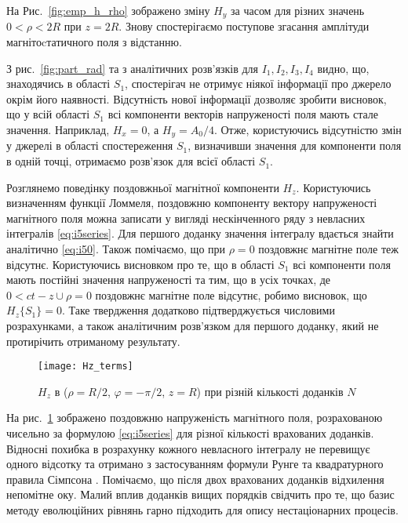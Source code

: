 На Рис.~\ref{fig:emp_h_rho} зображено зміну $ H_y $ за часом для 
різних значень $ 0 < \rho < 2R $ при $ z = 2R $. Знову спостерігаємо 
поступове згасання амплітуди магнітоcтатичного поля з відстанню.

З рис.~\ref{fig:part_rad} та з аналітичних розв'язків для 
$ I_1, I_2, I_3, I_4 $ видно, що, знаходячись в області $ S_1 $, 
спостерігач не отримує ніякої інформації про джерело окрім його наявності.
Відсутність нової інформації дозволяє зробити висновок, що у всій області 
$ S_1 $ всі компоненти векторів напруженості поля мають стале значення.
Наприклад, $ H_x = 0 $, а $ H_y = A_0/4 $. Отже, користуючись відсутністю 
змін у джерелі в області спостереження $ S_1 $, визначивши значення для 
компоненти поля в одній точці, отримаємо розв'язок для всієї області $ S_1 $.  

Розглянемо поведінку поздовжньої магнітної компоненти $ H_z $. Користуючись
визначенням функції Ломмеля, поздовжню компоненту вектору напруженості 
магнітного поля можна записати у вигляді нескінченного ряду з невласних 
інтегралів \eqref{eq:i5series}. Для першого доданку значення інтегралу 
вдається знайти аналітично \eqref{eq:i50}. Також помічаємо, що при 
$ \rho = 0 $ поздовжнє магнітне поле теж відсутнє. Користуючись висновком 
про те, що в області $ S_1 $ всі компоненти поля мають постійні значення 
напруженості та тим, що в усіх точках, де $ 0 < ct - z \cup \rho = 0 $ 
поздовжнє магнітне поле відсутнє, робимо висновок, що $ H_z \{ S_1 \} = 0 $.
Таке твердження додатково підтверджується числовими розрахунками, а також
аналітичним розв'язком для першого доданку, який не протирічить отриманому
результату.

\begin{figure}[h] \begin{center}
\texttt{[image: Hz\_terms]}
\caption{$H_z$ в ($\rho = R/2$, $\varphi = -\pi/2$, $z = R$) при 
різній кількості доданків $ N $} \label{fig:hz_terms}
\end{center} \end{figure}

На рис.~\ref{fig:hz_terms} зображено поздовжню напруженість магнітного поля,
розрахованою чисельно за формулою \eqref{eq:i5series} для різної кількості 
врахованих доданків. Відносні похибка в розрахунку кожного невласного 
інтегралу не перевищує одного відсотку та отримано з застосуванням формули
Рунге \cite{imp:NumRecipes2007} та квадратурного правила Сімпсона 
\cite{imp:NumRecipes2007}. Помічаємо, що після двох врахованих 
доданків відхилення непомітне оку. Малий вплив доданків вищих порядків 
свідчить про те, що базис методу еволюційних рівнянь гарно підходить для 
опису нестаціонарних процесів.

